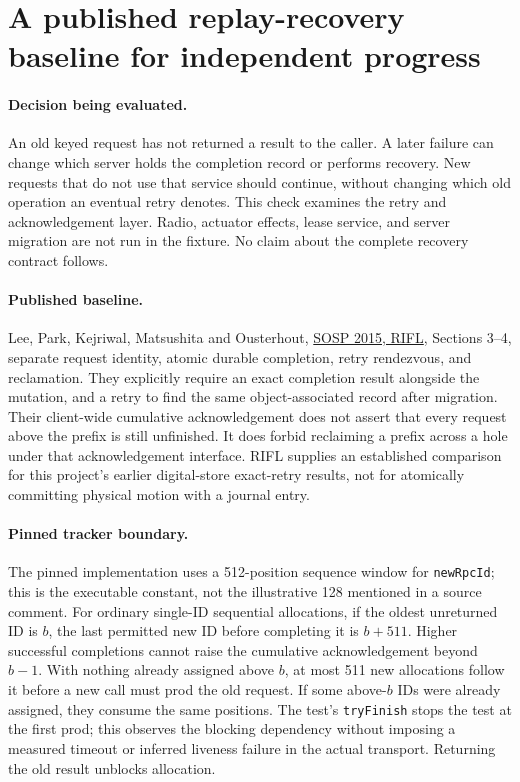 \documentclass{article}
\begin{document}
\section*{A published replay-recovery baseline for independent progress}
\paragraph{Decision being evaluated.}
An old keyed request has not returned a result to the caller. A later
failure can change which server holds the completion record or performs
recovery. New requests that do not use that service should continue,
without changing which old operation an eventual retry denotes.
This check examines the retry and acknowledgement layer. Radio,
actuator effects, lease service, and server migration are not run in the
fixture. No claim about the complete recovery contract follows.

\paragraph{Published baseline.}
Lee, Park, Kejriwal, Matsushita and Ousterhout,
\href{https://doi.org/10.1145/2815400.2815416}{SOSP 2015, RIFL},
Sections 3--4, separate request identity, atomic durable completion,
retry rendezvous, and reclamation. They explicitly require an exact
completion result alongside the mutation, and a retry to find the same
object-associated record after migration. Their client-wide cumulative
acknowledgement does not assert that every request above the prefix
is still unfinished. It does forbid reclaiming a prefix across a hole
under that acknowledgement interface. RIFL supplies an established
comparison for this project's earlier digital-store exact-retry results,
not for atomically committing physical motion with a journal entry.

\paragraph{Pinned tracker boundary.}
The pinned implementation uses a 512-position sequence window for
\texttt{newRpcId}; this is the executable constant, not the illustrative
128 mentioned in a source comment. For ordinary single-ID sequential
allocations, if the oldest unreturned ID is $b$, the last permitted
new ID before completing it is $b+511$. Higher successful completions
cannot raise the cumulative acknowledgement beyond $b-1$. With nothing
already assigned above $b$, at most 511 new allocations follow it
before a new call must prod the old request. If some above-$b$ IDs were
already assigned, they consume the same positions. The test's
\texttt{tryFinish} stops the test at the first prod; this observes the
blocking dependency without imposing a measured timeout or inferred
liveness failure in the actual transport. Returning the old result
unblocks allocation.
\end{document}
